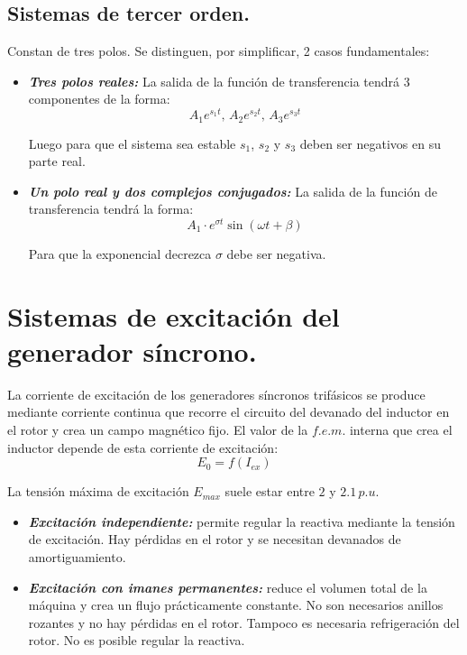 		\subsection{Sistemas de tercer orden.}
			Constan de tres polos. Se distinguen, por simplificar, 2 casos fundamentales:
			\begin{itemize}
				\item \textbf{\textit{Tres polos reales:}}
				 	La salida de la función de transferencia tendrá 3 componentes de la forma:
				 	\[A_1 e^{s_1 t},\,A_2 e^{s_2 t},\,A_3 e^{s_3 t}\]
				 	
				 	Luego para que el sistema sea estable $s_1$, $s_2$ y $s_3$ deben ser negativos en su parte real.
				 	
				 \item \textbf{\textit{Un polo real y dos complejos conjugados:}}
				 	La salida de la función de transferencia tendrá la forma:
				 	\[A_1\cdot e^{\sigma t} \sin (\omega t + \beta)\]
				 	
				 	Para que la exponencial decrezca $\sigma$ debe ser negativa.
			\end{itemize}
	
	\section{Sistemas de excitación del generador síncrono.}
		La corriente de excitación de los generadores síncronos trifásicos se produce mediante corriente continua que recorre el circuito del devanado del inductor en el rotor y crea un campo magnético fijo. El valor de la $f.e.m.$ interna que crea el inductor depende de esta corriente de excitación:
		\[E_0 = f(I_{ex})\]
		
		
		La tensión máxima de excitación $E_{max}$ suele estar entre $2$ y $2.1\,p.u.$
		\begin{itemize}
			\item \textbf{\textit{Excitación independiente:}} permite regular la reactiva mediante la tensión de excitación. Hay pérdidas en el rotor y se necesitan devanados de amortiguamiento.
			\item \textbf{\textit{Excitación con imanes permanentes:}} reduce el volumen total de la máquina y crea un flujo prácticamente constante. No son necesarios anillos rozantes y no hay pérdidas en el rotor. Tampoco es necesaria refrigeración del rotor. No es posible regular la reactiva.
		\end{itemize}
		
